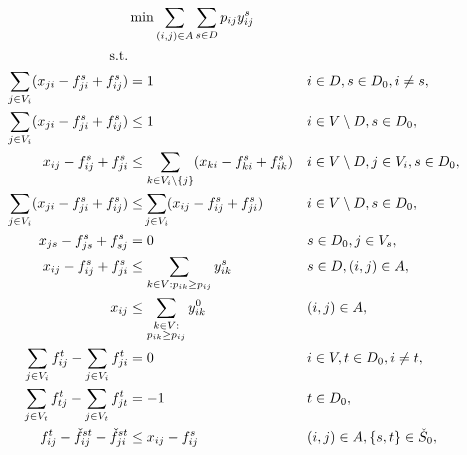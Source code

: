 \begin{subequations}
\begin{flalign}
\label{objective:mfinpf2} &\makebox[0pt][l]{$\displaystyle{}\min \sum\limits_{(i,j) \in A} \sum\limits_{s \in D} p_{ij} y^s_{ij} $}  & &&\\ \notag  
   \text{s.t.}&  &  &                 && \\	\
     \label{con:mfinpf2:arrowFromDest}  \sum\limits_{j\in V_i}(x_{ji}-f^s_{ji}+f^s_{ij})          & = 1       			&& i\in D, s\in D_0, i \neq s, && \\ 
		  \label{con:mfinpf2:arrowFromNonDestB}  \sum\limits_{j \in V_i}(x_{ji}-f^s_{ji}+f^s_{ij})  &\leq 1 && i\in V \setminus D, s\in D_0,   &&\\		
		  \label{con:mfinpf2:arrowFromNonDestA}  x_{ij}-f^s_{ij}+f^s_{ji}  & \leq \sum\limits_{k \in V_i\setminus\{j\}}(x_{ki}-f^s_{ki}+f^s_{ik}) &&
		  i\in V \setminus D,j\in V_i, s\in D_0,   &&\\		  
      \label{con:mfinpf2:extraCon}  \sum\limits_{j \in V_i}(x_{ji}-f^s_{ji}+f^s_{ij}) & \leq \sum_{\mathclap{j \in V_i}}(x_{ij}-f^s_{ij}+f^s_{ji}) &&  i\in V\setminus D, s\in D_0,  &&\\			  \label{con:mfinpf2:startInSource}  x_{js} - f^s_{js}+f^s_{sj}    & = 0       			&&  s\in D_0, j\in V_s, &&\\		 
		  \label{con:mfinpf2:yvar}  x_{ij}-f^s_{ij}+f^s_{ji} & \leq \sum\limits_{k\in V:p_{ik}\geq p_{ij}}y^s_{ik} && s\in D, (i,j)\in A, 		&&\\  
		  \label{con:mfinpf2:yvar0} x_{ij} &\leq \sum\limits_{\substack{k\in V: \\ p_{ik}\geq p_{ij}}}y^0_{ik}   && (i,j)\in A, \\  		
		 		 \label{con:mfinpf2:flowNormal}  \sum\limits_{\substack{ j\in V_i }}f^t_{ij}-\sum\limits_{\substack{j\in V_i }}f^t_{ji}    & = 0     			&& i\in V, t\in D_0, i \neq t, &&\\	
		 	 \label{con:mfinpf2:flowDest}  \sum\limits_{\substack{j\in V_t}}f^t_{tj}-\sum\limits_{\substack{j\in V_t}}f^t_{jt}    & = -1     			&&  t \in D_0, &&\\	
           \label{con:mfinpf2:fcap}   f^t_{ij} - \check{f}^{st}_{ij} - \check{f}^{st}_{ji} &\leq  x_{ij}-f^s_{ij}   && (i,j)\in A, \{s,t\}\in \check{S}_0, && &\\ 		 			 	 

\end{flalign}
\end{subequations}
